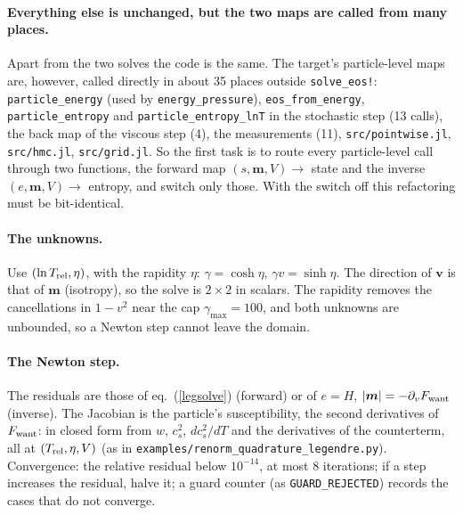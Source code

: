 \documentclass[11pt,aps,preprint,nofootinbib,superscriptaddress,tightenlines]{revtex4-2}
\def\Eq#1{eq.~(\ref{#1})}
\let\oldparagraph\paragraph
\renewcommand{\paragraph}{\par\bigskip\oldparagraph}
\begin{document}
\paragraph{Everything else is unchanged, but the two maps are called from many places.}  Apart from the two solves the code is the same.  The target's
particle-level maps are, however, called directly in about 35 places outside \texttt{solve\_eos!}: \texttt{particle\_energy} (used by \texttt{energy\_pressure}),
\texttt{eos\_from\_energy}, \texttt{particle\_entropy} and \texttt{particle\_entropy\_lnT} in the stochastic step (13 calls), the back map of the viscous step (4), the
measurements (11), \nolinkurl{src/pointwise.jl}, \nolinkurl{src/hmc.jl}, \nolinkurl{src/grid.jl}.  So the first task is to route every particle-level call through two
functions, the forward map $(s,\bm m,V)\to$ state and the inverse $(e,\bm m,V)\to$ entropy, and switch only those.  With the switch off this refactoring must be
bit-identical.

\paragraph{The unknowns.}  Use $(\ln T_{\rm rel},\eta)$, with the rapidity $\eta$: $\gamma=\cosh\eta$, $\gamma v=\sinh\eta$.  The direction of $\bm v$ is that of $\bm m$
(isotropy), so the solve is $2\times2$ in scalars.  The rapidity removes the cancellations in $1-v^2$ near the cap $\gamma_{\max}=100$, and both unknowns are
unbounded, so a Newton step cannot leave the domain.

\paragraph{The Newton step.}  The residuals are those of \Eq{legsolve} (forward) or of $e=H$, $|\bm m|=-\partial_vF_{\rm want}$ (inverse).  The Jacobian is the particle's
susceptibility, the second derivatives of $F_{\rm want}$: in closed form from $w$, $c_s^2$, $dc_s^2/dT$ and the derivatives of the counterterm, all at $(T_{\rm rel},\eta,V)$
(as in \nolinkurl{examples/renorm_quadrature_legendre.py}).  Convergence: the relative residual below $10^{-14}$, at most 8 iterations; if a step increases the
residual, halve it; a guard counter (as \texttt{GUARD\_REJECTED}) records the cases that do not converge.
\end{document}
